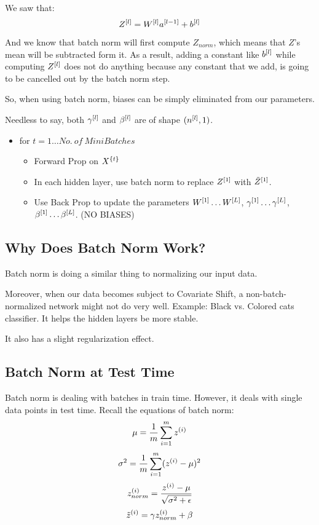 We saw that: 
$$
Z^{[l]} = W^{[l]}a^{[l-1]} + b^{[l]}
$$
And we know that batch norm will first compute $Z_{norm}$, which means that $Z$'s mean will be subtracted form it.
As a result, adding a constant like $b^{[l]}$ while computing $Z^{[l]}$ does not do anything because any constant that we add, is going to be cancelled out by the batch norm step.

So, when using batch norm, biases can be simply eliminated from our parameters. 

Needless to say, both $\gamma^{[l]}$ and $\beta^{[l]}$ are of shape $(n^{[l]}, 1)$. 

\begin{itemize}
    \item for $t=1 \dots No.\ of\ MiniBatches$
    \begin{itemize}
        \item[] Forward Prop on $X^{\{t\}}$ 
        \item[] In each hidden layer, use batch norm to replace $Z^{[1]}$ with $\tilde{Z}^{[1]}$. 
        \item[] Use Back Prop to update the parameters $W^{[1]} \dots W^{[L]}$, $\gamma^{[1]} \dots \gamma^{[L]}$, $\beta^{[1]} \dots \beta^{[L]}$. (NO BIASES) 
    \end{itemize}
\end{itemize}

\subsection{Why Does Batch Norm Work?}
Batch norm is doing a similar thing to normalizing our input data. 

Moreover, when our data becomes subject to Covariate Shift, a non-batch-normalized network might not do very well. Example: Black vs. Colored cats classifier. 
It helps the hidden layers be more stable. 

It also has a slight regularization effect. 

\subsection{Batch Norm at Test Time}
Batch norm is dealing with batches in train time. However, it deals with single data points in test time. 
Recall the equations of batch norm: 
$$
\mu = \frac{1}{m}\sum_{i=1}^{m} z^{(i)}
$$
$$
\sigma^2= \frac{1}{m}\sum_{i=1}^{m} (z^{(i)} - \mu)^2
$$
$$
z^{(i)}_{norm} = \frac{z^{(i)} - \mu}{\sqrt{\sigma^2 + \epsilon}}
$$
$$
\tilde{z}^{(i)} = \gamma z^{(i)}_{norm} + \beta
$$

